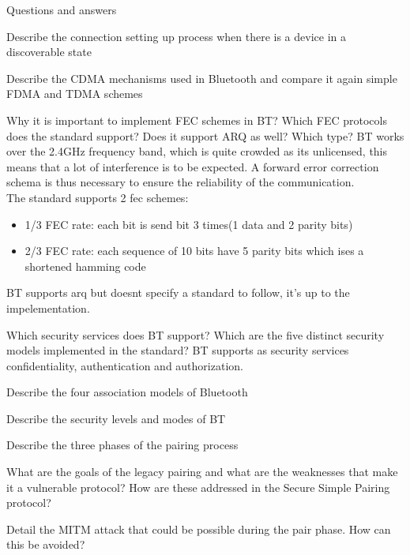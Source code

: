 \begin{section}{Questions and answers}
\begin{subsubsection}{Describe the connection setting up process when there is a device in a
    discoverable state}
  \end{subsubsection}
  \begin{subsubsection}{Describe the CDMA mechanisms used in Bluetooth and compare it again simple
    FDMA and TDMA schemes}
  \end{subsubsection}
  \begin{subsubsection}{Why it is important to implement FEC schemes in BT? Which FEC protocols does
    the standard support? Does it support ARQ as well? Which type?}
    BT works over the 2.4GHz frequency band, which is quite crowded as its unlicensed, this means
    that a lot of interference is to be expected. A forward error correction schema is thus
    necessary to ensure the reliability of the communication.\\
    The standard supports 2 fec schemes:
    \begin{itemize}
      \item 1/3 FEC rate: each bit is send bit 3 times(1 data and 2 parity bits)
      \item 2/3 FEC rate: each sequence of 10 bits have 5 parity bits which ises a shortened hamming
        code 
    \end{itemize}
    BT supports arq but doesnt specify a standard to follow, it's up to the impelementation.
  \end{subsubsection}
  \begin{subsubsection}{Which security services does BT support? Which are the five distinct
    security models implemented in the standard?}
    BT supports as security services confidentiality, authentication and authorization. 
  \end{subsubsection}
  \begin{subsubsection}{Describe the four association models of Bluetooth}
  \end{subsubsection}
  \begin{subsubsection}{Describe the security levels and modes of BT}
  \end{subsubsection}
  \begin{subsubsection}{Describe the three phases of the pairing process}
  \end{subsubsection}
  \begin{subsubsection}{What are the goals of the legacy pairing and what are the weaknesses that
    make it a vulnerable protocol? How are these addressed in the Secure Simple Pairing protocol?}
  \end{subsubsection}
  \begin{subsubsection}{Detail the MITM attack that could be possible during the pair phase. How can
    this be avoided?}

\end{subsubsection}
\end{section}
